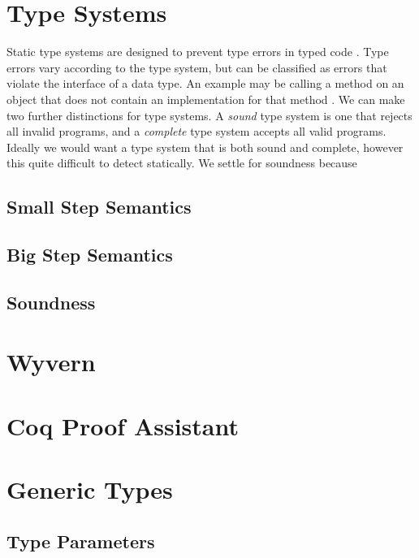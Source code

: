 \documentclass[11pt
              , a4paper
              , twoside
              , openright
              ]{report}
\numberwithin{case}{theorem}
\numberwithin{subcase}{case}
\begin{document}
\section{Type Systems}
Static type systems are designed to prevent type errors in typed code \cite{Wright:1994:SAT:191905.191909}. Type errors vary according to the type system, but can be classified as errors that violate the interface of a data type. An example may be calling a method on an object that does not contain an implementation for that method \cite{Wright:1994:SAT:191905.191909}. We can make two further distinctions for type systems. A \emph{sound} type system is one that rejects all invalid programs, and a \emph{complete} type system accepts all valid programs. Ideally we would want a type system that is both sound and complete, however this quite difficult to detect statically. We settle for soundness because 

\subsection{Small Step Semantics}

\subsection{Big Step Semantics}

\subsection{Soundness}


\section{Wyvern}

\section{Coq Proof Assistant}






\section{Generic Types}


\subsection{Type Parameters}
\end{document}
